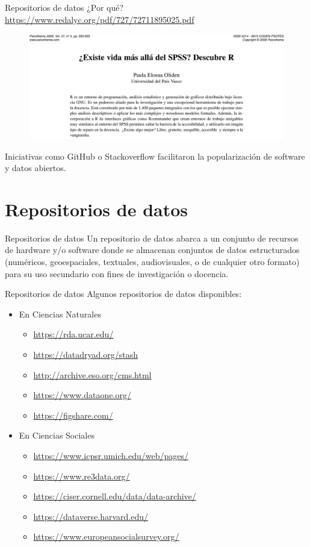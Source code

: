 \documentclass{beamer}
\begin{document}
\begin{frame}{Repositorios de datos ¿Por qué?}
\textcolor{blue}{\url{https://www.redalyc.org/pdf/727/72711895025.pdf}}
\begin{figure}
\centering
\includegraphics[width=1\textwidth]{RSPSS.png}
\end{figure}
Iniciativas como GitHub o Stackoverflow facilitaron la popularización de software y datos abiertos.
\end{frame}

\section{Repositorios de datos}
\begin{frame}{Repositorios de datos}
Un repositorio de datos abarca a un conjunto de recursos de hardware y/o software donde se almacenan conjuntos de datos estructurados (numéricos, geoespaciales, textuales, audiovisuales, o de cualquier otro formato) para su uso secundario con fines de investigación o docencia.
\end{frame}

\begin{frame}{Repositorios de datos}
Algunos repositorios de datos disponibles:
\begin{itemize}
\item En Ciencias Naturales
\begin{itemize}
    \item \url{https://rda.ucar.edu/}
    \item \url{https://datadryad.org/stash}
    \item \url{http://archive.eso.org/cms.html}
    \item \url{https://www.dataone.org/}
    \item \url{https://figshare.com/}
\end{itemize}
\item En Ciencias Sociales
\begin{itemize}
    \item \url{https://www.icpsr.umich.edu/web/pages/}
    \item \url{https://www.re3data.org/}
    \item \url{https://ciser.cornell.edu/data/data-archive/}
    \item \url{https://dataverse.harvard.edu/}
    \item \url{https://www.europeansocialsurvey.org/}
\end{itemize}
\end{itemize}
\end{frame}
\end{document}
